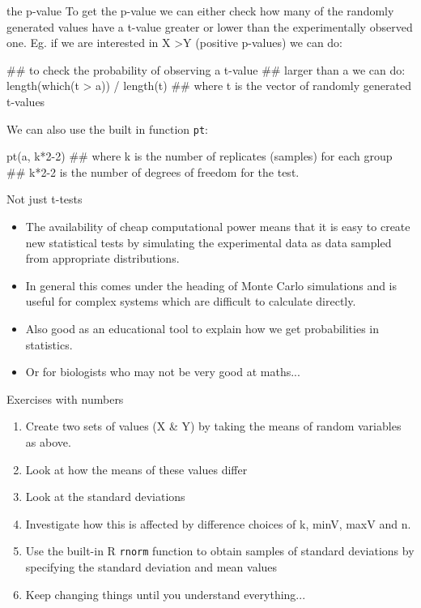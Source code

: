 \documentclass[pdf]{beamer}
\begin{document}
\begin{frame}[fragile]{the p-value}
  To get the p-value we can either check how many of the randomly
  generated values have a t-value greater or lower than the experimentally
  observed one. Eg. if we are interested in X \textgreater Y (positive
  p-values) we can do:
  \begin{rcode}
    ## to check the probability of observing a t-value 
    ## larger than a we can do:
    length(which(t > a)) / length(t)
    ## where t is the vector of randomly generated t-values
  \end{rcode}

  We can also use the built in function \texttt{pt}:
  \begin{rcode}
    pt(a, k*2-2)
    ## where k is the number of replicates (samples) for each group
    ## k*2-2 is the number of degrees of freedom for the test.
  \end{rcode}
  
\end{frame}

\begin{frame}{Not just t-tests}
  \begin{itemize}
  \item The availability of cheap computational power means that it
    is easy to create new statistical tests by simulating the
    experimental data as data sampled from appropriate distributions.
  \item In general this comes under the heading of Monte Carlo simulations
    and is useful for complex systems which are difficult to calculate
    directly.
  \item Also good as an educational tool to explain how we get probabilities
    in statistics.
  \item Or for biologists who may not be very good at maths...
  \end{itemize}
\end{frame}

\begin{frame}{Exercises with numbers}
  \begin{enumerate}
  \item Create two sets of values (X \& Y) by taking the means of random
    variables as above.
  \item Look at how the means of these values differ
  \item Look at the standard deviations
  \item Investigate how this is affected by difference choices of k, minV,
    maxV and n.
  \item Use the built-in R \texttt{rnorm} function to obtain samples of
    standard deviations by specifying the standard deviation and mean values
  \item Keep changing things until you understand everything...
  \end{enumerate}
\end{frame}
\end{document}
